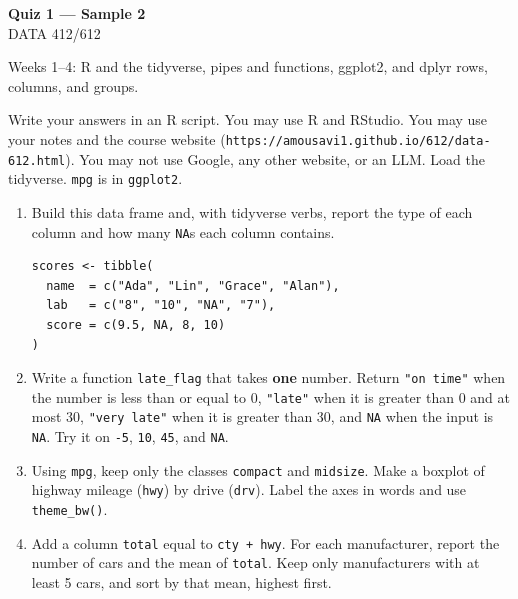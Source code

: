 \documentclass[11pt]{article}
\begin{document}
\begin{center}
{\LARGE\bfseries Quiz 1 --- Sample 2}\\[0.35em]
DATA 412/612
\end{center}

\vspace{0.3em}

Weeks 1--4: R and the tidyverse, pipes and functions, ggplot2,
and dplyr rows, columns, and groups.

Write your answers in an R script. You may use R and RStudio.
You may use your notes and the course website
(\texttt{https://amousavi1.github.io/612/data-612.html}).
You may not use Google, any other website, or an LLM.
Load the tidyverse. \texttt{mpg} is in \texttt{ggplot2}.

\begin{enumerate}
\item Build this data frame and, with tidyverse verbs, report the type
of each column and how many \texttt{NA}s each column contains.

\begin{lstlisting}
scores <- tibble(
  name  = c("Ada", "Lin", "Grace", "Alan"),
  lab   = c("8", "10", "NA", "7"),
  score = c(9.5, NA, 8, 10)
)
\end{lstlisting}

\item Write a function \texttt{late\_flag} that takes \textbf{one} number.
Return \texttt{"on time"} when the number is less than or equal to 0,
\texttt{"late"} when it is greater than 0 and at most 30,
\texttt{"very late"} when it is greater than 30,
and \texttt{NA} when the input is \texttt{NA}.
Try it on \texttt{-5}, \texttt{10}, \texttt{45}, and \texttt{NA}.

\item Using \texttt{mpg}, keep only the classes \texttt{compact} and
\texttt{midsize}. Make a boxplot of highway mileage (\texttt{hwy})
by drive (\texttt{drv}). Label the axes in words and use
\texttt{theme\_bw()}.

\item Add a column \texttt{total} equal to \texttt{cty + hwy}.
For each manufacturer, report the number of cars and the mean of
\texttt{total}. Keep only manufacturers with at least 5 cars, and
sort by that mean, highest first.
\end{enumerate}
\end{document}
